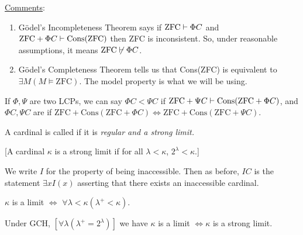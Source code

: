 \documentclass[]{article}
\newcommand{\zfc}{\textrm{ZFC}}
\newcommand{\cons}{\textrm{Cons}}
\begin{document}
\underline{Comments}:\ 
    \begin{enumerate}[label=(\roman*)]
        \item G{\"o}del's Incompleteness Theorem says if $\zfc \proves \Phi C$ and $\zfc + \Phi C \proves \textrm{Cons(ZFC)}$ then ZFC is inconsistent. So, under reasonable assumptions, it means $\zfc \not\proves \Phi C$.
        \item G{\"o}del's Completeness Theorem tells us that Cons(ZFC) is equivalent to $\exists M (M\models \zfc)$. The model property is what we will be using.
    \end{enumerate}

If $\Phi,\Psi$ are two LCPs, we can say \underline{$\Phi C < \Psi C$} if $\zfc + \Psi C \proves \textrm{Cons}(\zfc+\Phi C)$, and $\Phi C,\Psi C$ are  if $\zfc + \cons(\zfc + \Phi C) \iff \zfc + \cons(\zfc + \Psi C)$.

\begin{defin*}
    A cardinal  is called  if it is \it{regular} and a \it{strong limit}.

    [A cardinal $\kappa$ is a strong limit if for all $\lambda < \kappa$, $2^\lambda < \kappa$.]

    We write $I$ for the property of being inaccessible. Then as before, $IC$ is the statement $\exists x I(x)$ asserting that there exists an inaccessible cardinal.
\end{defin*}
\begin{remark*}
    $\kappa$ is a limit $\iff$ $\forall \lambda < \kappa (\lambda^+ < \kappa)$.
\end{remark*}
\begin{remark*}
    Under GCH, $[\forall \lambda (\lambda^+ = 2^\lambda)]$ we have $\kappa$ is a limit $\iff \kappa$ is a strong limit.
\end{remark*}
\end{document}
